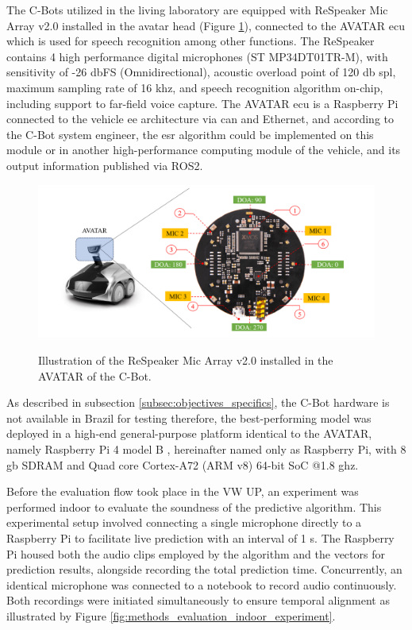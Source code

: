 The C-Bots utilized in the living laboratory are equipped with ReSpeaker Mic Array v2.0 \cite{ReSpeake72} installed in the avatar head (Figure \ref{fig:methods_evaluation_AVATAR_ReSpeaker}), connected to the AVATAR \gls{ecu} which is used for speech recognition among other functions. The ReSpeaker contains 4 high performance digital microphones (ST MP34DT01TR-M), with sensitivity of -26 \gls{db}FS (Omnidirectional), acoustic overload point of 120 \gls{db} \gls{spl}, maximum sampling rate of 16 \gls{k}\gls{hz}, and speech recognition algorithm on-chip, including support to far-field voice capture. The AVATAR \gls{ecu} is a Raspberry Pi connected to the vehicle \gls{ee} architecture via \gls{can} and Ethernet, and according to the C-Bot system engineer, the \gls{esr} algorithm could be implemented on this module or in another high-performance computing module of the vehicle, and its output information published via ROS2. 

\begin{figure}[htbp]
    \raggedright
        \caption{Illustration of the ReSpeaker Mic Array v2.0 installed in the AVATAR of the C-Bot.}
        \includegraphics[width=.85\textwidth]{resources/images/050-methods/Methods_evaluation_microphone_ReSpeaker_Mic_Array_v2.0.png}
        \label{fig:methods_evaluation_AVATAR_ReSpeaker}
\end{figure}

As described in subsection \ref{subsec:objectives_specifics}, the C-Bot hardware is not available in Brazil for testing therefore, the best-performing model was deployed in a high-end general-purpose platform identical to the AVATAR, namely Raspberry Pi 4 model B \cite{Raspberry2023}, hereinafter named only as Raspberry Pi, with 8 \gls{g}\gls{b} SDRAM and Quad core Cortex-A72 (ARM v8) 64-bit SoC @1.8 \gls{g}\gls{hz}. 

Before the evaluation flow took place in the VW UP, an experiment was performed indoor to evaluate the soundness of the predictive algorithm. This experimental setup involved connecting a single microphone directly to a Raspberry Pi to facilitate live prediction with an interval of 1 \gls{s}. The Raspberry Pi housed both the audio clips employed by the algorithm and the vectors for prediction results, alongside recording the total prediction time. Concurrently, an identical microphone was connected to a notebook to record audio continuously. Both recordings were initiated simultaneously to ensure temporal alignment as illustrated by Figure \ref{fig:methods_evaluation_indoor_experiment}.

